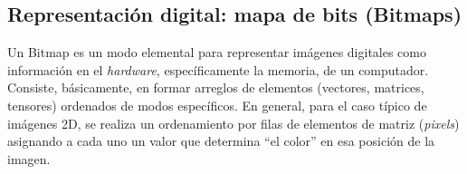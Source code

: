 %   
%   
% 
% 
% 
% 
% 
% 
%   
%   

\subsection{Representaci\'on digital: mapa de bits (Bitmaps)}

Un Bitmap es un modo elemental para representar im\'agenes digitales como informaci\'on en el \textit{hardware}, espec\'ificamente la memoria, de un
computador.
%
Consiste, b\'asicamente, en formar arreglos de elementos (vectores, matrices, tensores) ordenados de modos espec\'ificos.
%
En general, para el caso t\'ipico de im\'agenes 2D, se realiza un ordenamiento por filas de elementos de matriz (\textit{pixels}) asignando a cada uno 
un valor que determina ``el color'' en esa posici\'on de la imagen.
%

